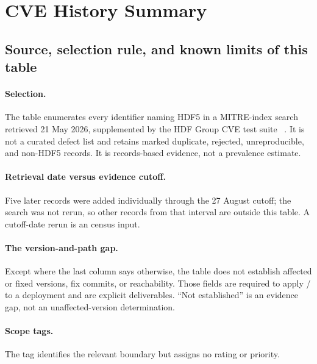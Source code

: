 \documentclass[../main.tex]{subfiles}
\begin{document}
\section{CVE History Summary}
\label{app:cve-history-summary}

\subsection*{Source, selection rule, and known limits of this table}

\paragraph{Selection.}
The table enumerates every identifier naming HDF5 in a MITRE-index search
retrieved 21 May 2026, supplemented by the HDF Group CVE test suite
~\cite{hdf5-cve-issues,cve_hdf5}. It is not a curated defect list and retains
marked duplicate, rejected, unreproducible, and non-HDF5 records. It is
records-based evidence, not a prevalence estimate.

\paragraph{Retrieval date versus evidence cutoff.}
Five later records were added individually through the 27 August cutoff; the
search was not rerun, so other records from that interval are outside this
table. A cutoff-date rerun is an  census input.

\paragraph{The version-and-path gap.}
Except where the last column says otherwise, the table does not establish
affected or fixed versions, fix commits, or reachability. Those fields are
required to apply / to a deployment and
are explicit  deliverables. ``Not established'' is an evidence gap,
not an unaffected-version determination.

\paragraph{Scope tags.}
The  tag identifies the relevant boundary but assigns no rating or
priority.
\end{document}
